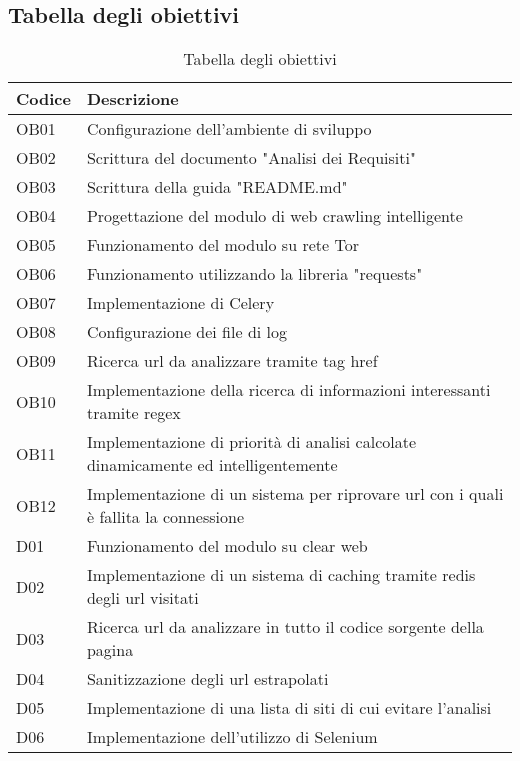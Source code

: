 \subsection{Tabella degli obiettivi}
\begin{longtable}{|p{}|p{}|}
	\caption{Tabella degli obiettivi}
	\label{tab:tabella-obiettivi} \\
	\hline
	\textbf{Codice}	&	\textbf{Descrizione} \\
    \hline
    OB01		&	Configurazione dell'ambiente di sviluppo \\  
	\hline
    OB02		&	Scrittura del documento "Analisi dei Requisiti" \\ 
	\hline
    OB03		&	Scrittura della guida "README.md" \\
    \hline
    OB04		&	Progettazione del modulo di web crawling intelligente \\
    \hline
    OB05		&	Funzionamento del modulo su rete Tor \\
    \hline
    OB06		&	Funzionamento utilizzando la libreria "requests" \\
    \hline
    OB07		&	Implementazione di Celery \\
    \hline
    OB08		&	Configurazione dei file di log \\
    \hline
    OB09		&	Ricerca url da analizzare tramite tag href \\
    \hline
    OB10		&	Implementazione della ricerca di informazioni interessanti tramite regex \\
    \hline
    OB11		&	Implementazione di priorità di analisi calcolate dinamicamente ed intelligentemente \\
    \hline
    OB12		&	Implementazione di un sistema per riprovare url con i quali è fallita la connessione \\
    \hline
    D01			&	Funzionamento del modulo su clear web \\
    \hline
    D02			&	Implementazione di un sistema di caching tramite redis degli url visitati \\
    \hline
    D03			&	Ricerca url da analizzare in tutto il codice sorgente della pagina \\
    \hline
    D04			&	Sanitizzazione degli url estrapolati \\
    \hline
    D05			&	Implementazione di una lista di siti di cui evitare l'analisi \\
    \hline 
    D06			&	Implementazione dell'utilizzo di Selenium \\

\end{longtable}
